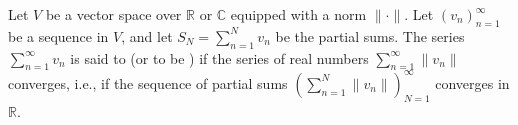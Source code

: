 \begin{definition} \label{definition:absolute_convergence_of_a_series_in_a_normed_vector_space}
Let $V$ be a vector space over $\mathbb{R}$ or $\mathbb{C}$ equipped with a norm $\|\cdot\|$. Let $(v_n)_{n=1}^\infty$ be a sequence in $V$, and let $S_N = \sum_{n=1}^N v_n$ be the partial sums. The series $\sum_{n=1}^\infty v_n$ is said to  (or to be ) if the series of real numbers $\sum_{n=1}^\infty \|v_n\|$ converges, i.e., if the sequence of partial sums $\left(\sum_{n=1}^N \|v_n\|\right)_{N=1}^\infty$ converges in $\mathbb{R}$.
\end{definition}
